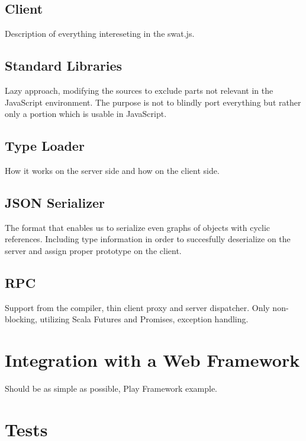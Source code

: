 \documentclass[12pt,a4paper]{report}
\begin{document}
\subsection{Client}

Description of everything intereseting in the swat.js.

\subsection{Standard Libraries}

Lazy approach, modifying the sources to exclude parts not relevant in the JavaScript environment. The purpose is not to blindly port everything but rather only a portion which is usable in JavaScript.

\subsection{Type Loader}

How it works on the server side and how on the client side.

\subsection{JSON Serializer}

The format that enables us to serialize even graphs of objects with cyclic references. Including type information in order to succesfully deserialize on the server and assign proper prototype on the client.

\subsection{RPC}

Support from the compiler, thin client proxy and server dispatcher. Only non-blocking, utilizing Scala Futures and Promises, exception handling.

\section{Integration with a Web Framework}

Should be as simple as possible, Play Framework example.

\section{Tests}
\end{document}
